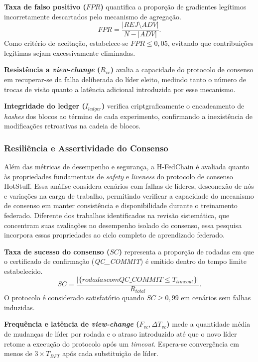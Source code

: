 \documentclass[12pt]{article}
\begin{document}
\textbf{Taxa de falso positivo ($FPR$)} quantifica a proporção de gradientes legítimos incorretamente descartados pelo mecanismo de agregação.
\[
FPR=\frac{|{REJ}\setminus{ADV}|}{N-|{ADV}|}.
\]
Como critério de aceitação, estabelece-se $FPR \leq 0,05$, evitando que contribuições legítimas sejam excessivamente eliminadas.

\textbf{Resistência a \textit{view-change} ($R_{vc}$)} avalia a capacidade do protocolo de consenso em recuperar-se da falha deliberada do líder eleito, medindo tanto o número de trocas de visão quanto a latência adicional introduzida por esse mecanismo.

\textbf{Integridade do ledger ($I_{ledger}$)} verifica criptgraficamente o encadeamento de \textit{hashes} dos blocos ao término de cada experimento, confirmando a inexistência de modificações retroativas na cadeia de blocos.

\subsubsection{Resiliência e Assertividade do Consenso}

Além das métricas de desempenho e segurança, a H-FedChain é avaliada quanto às propriedades fundamentais de \textit{safety} e \textit{liveness} do protocolo de consenso HotStuff. Essa análise considera cenários com falhas de líderes, desconexão de nós e variações na carga de trabalho, permitindo verificar a capacidade do mecanismo de consenso em manter consistência e disponibilidade durante o treinamento federado. Diferente dos trabalhos identificados na revisão sistemática, que concentram suas avaliações no desempenho isolado do consenso, essa pesquisa incorpora essas propriedades ao ciclo completo de aprendizado federado.

\textbf{Taxa de sucesso do consenso ($SC$)} representa a proporção de rodadas em que o certificado de confirmação (\textit{QC\_COMMIT}) é emitido dentro do tempo limite estabelecido.
\[
SC=\frac{|\{{rodadas com QC\_COMMIT}\leq T_{{timeout}}\}|}{R_{{total}}}.
\]
O protocolo é considerado satisfatório quando $SC \geq 0,99$ em cenários sem falhas induzidas.

\textbf{Frequência e latência de \textit{view-change} ($F_{{vc}},\Delta T_{{vc}}$)} mede a quantidade média de mudanças de líder por rodada e o atraso introduzido até que o novo líder retome a execução do protocolo após um \textit{timeout}. Espera-se convergência em menos de $3\times T_{{BFT}}$ após cada substituição de líder.
\end{document}
